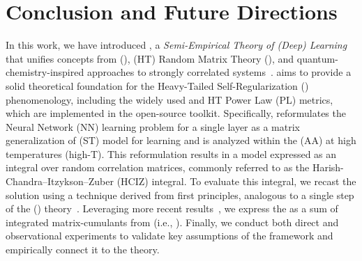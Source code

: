 \section{Conclusion and Future Directions}
\label{sxn:conclusions}

In this work, we have introduced \SETOL, a \emph{Semi-Empirical Theory of (Deep) Learning}
that unifies concepts from \StatisticalMechanics (\STATMECH), \HeavyTailed (HT) Random Matrix Theory (\RMT), and quantum-chemistry-inspired approaches to strongly correlated systems~\cite{Martin1996,Martin1996_CPL,Martin1998}. \SETOL aims to provide a solid theoretical foundation for the Heavy-Tailed Self-Regularization (\HTSR) phenomenology, including the widely used \ALPHA and \ALPHAHAT HT Power Law (PL) \LayerQuality metrics, which are implemented in the open-source \WW toolkit. Specifically, \SETOL reformulates the Neural Network (NN) learning problem for a single layer as a matrix generalization of  \StudentTeacher (ST) model for \Perceptron learning
and is analyzed within the \AnnealedApproximation (AA) at high temperatures (high-T).
This reformulation results in a model expressed as an integral over random \Student correlation matrices, commonly referred to as the Harish-Chandra–Itzykson–Zuber (HCIZ) integral. To evaluate this integral, we recast the solution using a technique derived from first principles, analogous to a single step of the \WilsonExactRenormalizationGroup (\ERG) theory~\cite{NobelPrizeRG,PhysRevLett.69.800}.
Leveraging more recent results~\cite{Tanaka2007,Tanaka2008}, we express the \LayerQuality as a sum of integrated matrix-cumulants from \RMT (i.e., \RTransforms). Finally, we conduct both direct and observational experiments to validate key assumptions of the \SETOL framework and empirically connect it to the \HTSR theory.

